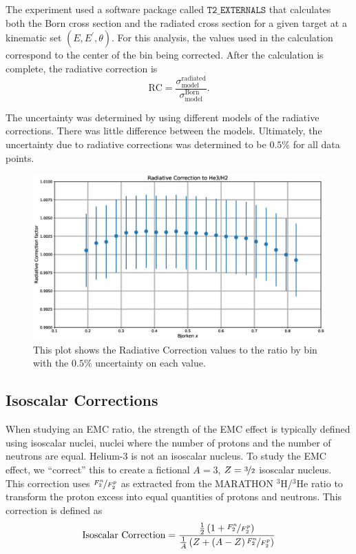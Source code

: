 The experiment used a software package called $\texttt{T2\_EXTERNALS}$ that calculates both the Born cross section and the radiated cross section for a given target at a kinematic set $(E,E^{\prime} ,\theta )$. For this analysis, the values used in the calculation correspond to the center of the bin being corrected. After the calculation is complete, the radiative correction is
\begin{equation}
	\textrm{RC} = \frac{\sigma^{\textrm{radiated}}_{\textrm{model}}}{\sigma^{\textrm{Born}}_{\textrm{model}}}.
\end{equation}

The uncertainty was determined by using different models of the radiative corrections. There was little difference between the models. Ultimately, the uncertainty due to radiative corrections was determined to be $0.5\%$ for all data points.

\begin{figure}
	\includegraphics[width=\textwidth]{./analysis/fig/radcor.eps}
	\caption{This plot shows the Radiative Correction values to the  ratio by bin with the $0.5\%$ uncertainty on each value.}
\end{figure}

\subsection{Isoscalar Corrections}
\label{sec:isocor}

When studying an EMC ratio, the strength of the EMC effect is typically defined using isoscalar nuclei, nuclei where the number of protons and the number of neutrons are equal. Helium-3 is not an isoscalar nucleus. To study the EMC effect, we ``correct'' this to create a fictional $A=3$, $Z=\nicefrac{3}{2}$ isoscalar nucleus. This correction uses $\nicefrac{F_2^n}{F_2^p}$ as extracted from the MARATHON $^3$H/$^3$He ratio to transform the proton excess into equal quantities of protons and neutrons. This correction is defined as
\begin{equation}
	\textrm{Isoscalar Correction} = \frac{\frac{1}{2}\left(1+\nicefrac{F_2^n}{F_2^p}\right)}{\frac{1}{A}\left(Z+\left(A-Z\right)\nicefrac{F_2^n}{F_2^p}\right)}
\end{equation}

